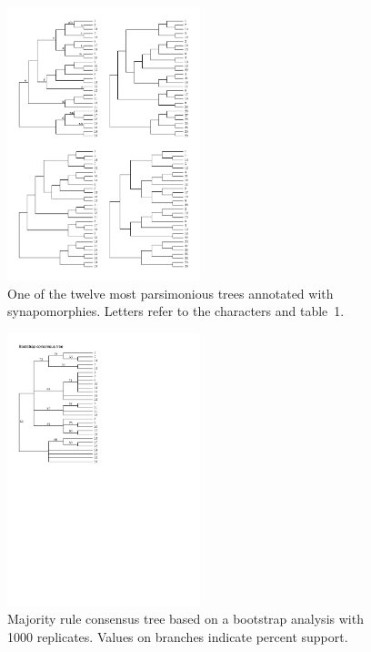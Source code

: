 \documentclass{article}
\begin{document}
            \begin{figure}
                \centering
                \includegraphics[width=0.5\textwidth]{mp.pdf}
                \caption{One of the twelve most parsimonious trees annotated with synapomorphies. Letters refer to the characters and table~1.}
            \end{figure}
            
            \begin{figure}
                \centering
                \includegraphics[width=0.5\textwidth]{bs.pdf}
                \caption{Majority rule consensus tree based on a bootstrap analysis with 1000 replicates. Values on branches indicate percent support.}
            \end{figure}
            
\end{document}
